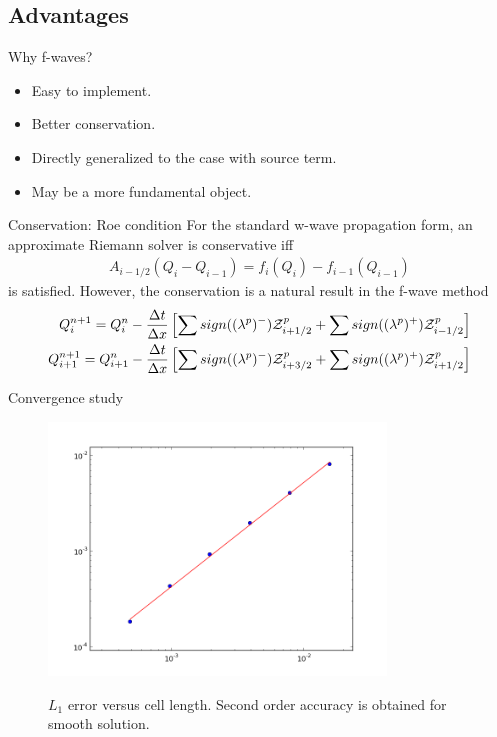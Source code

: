 \documentclass{beamer}
\begin{document}
\subsection{Advantages}
\begin{frame}{Why f-waves?}
\begin{itemize}
\item Easy to implement.
\item Better conservation.
\item Directly generalized to the case with source term.
\item May be a more fundamental object.
\end{itemize}
\end{frame}

\begin{frame}{Conservation: Roe condition}
For the standard w-wave propagation form, an approximate Riemann solver is conservative iff
\begin{align*}
A_{i-1/2}(Q_i-Q_{i-1})=f_{i}(Q_i)-f_{i-1}(Q_{i-1})
\end{align*}
is satisfied. However, the conservation is a natural result in the f-wave method
\begin{align*}
Q_i^{n+1}=Q_i^{n}-\frac{\Delta t}{\Delta x}\left[\sum sign((\lambda^p)^-) {\cal Z}_{i+1/2}^p+\sum sign((\lambda^p)^+) {\cal Z}_{i-1/2}^p\right] \\
Q_{i+1}^{n+1}=Q_{i+1}^{n}-\frac{\Delta t}{\Delta x}\left[\sum sign((\lambda^p)^-) {\cal Z}_{i+3/2}^p+\sum sign((\lambda^p)^+) {\cal Z}_{i+1/2}^p\right]
\end{align*}
\end{frame}

\begin{frame}{Convergence study}
\begin{figure}
  \centering
  \includegraphics[width=0.8\textwidth]{loglog_error.png}\\
  \caption{$L_1$ error versus cell length. Second order accuracy is obtained for smooth solution.}\label{conv}
\end{figure}

\end{frame}
\end{document}
